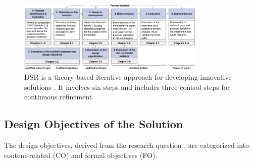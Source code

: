 \documentclass[10pt]{article}
\begin{document}
\begin{figure}[thb]
    \centering
    \includegraphics[width=0.8\textwidth]{PDF/images/cropped DSR_V01.pdf}
    \caption{DSR is a theory-based iterative approach for developing innovative solutions \cite{Peffers.2007}. It involves six steps \cite{Peffers.2007} and includes three control steps \cite{Sonnenberg.2012} for continuous refinement.}
    \label{fig: DSRM}
\end{figure}

\subsection{Design Objectives of the Solution} \label{sec:designobjectives}


The design objectives, derived from the research question \cite{Peffers.2007}, are categorized into content-related (CO) and formal objectives (FO).
\end{document}
